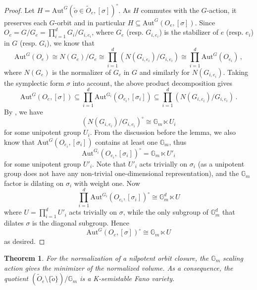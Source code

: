 \documentclass[12pt]{amsart}
\newtheorem{thm}[prop]{Theorem}
\theoremstyle{definition}
\newcommand{\bT}{\mathbb{T}}
\newcommand{\bG}{\mathbb{G}}
\newcommand{\Aut}{\mathrm{Aut}}
\numberwithin{equation}{section}
\begin{document}
\begin{proof}
Let $H=\Aut^G(\tilde{o} \in \widetilde{O}_e,[\sigma])^\circ$. As $H$ commutes with the $G$-action, it preserves each $G$-orbit and in particular $H\subseteq  \Aut^G(O_e,[\sigma])$.
Since $O_e=G/G_e = \prod_{i=1}^d G_i/G_{i,e_i}$, where $G_e$ (resp. $G_{i,e_i}$) is the stabilizer of $e$ (resp. $e_i$) in $G$ (resp. $G_i$), we know that
\[
\Aut^G(O_e) \cong N(G_e)/G_e \cong \prod_{i=1}^d \left(N(G_{i,e_i})/G_{i,e_i}\right)\cong \prod_{i=1}^d \Aut^G(O_{e_i})\,,
\]
where $N(G_e)$ is the normalizer of $G_e$ in $G$ and similarly for $N(G_{i,e_i})$. Taking the symplectic form $\sigma$ into account, the above product decomposition gives
\[
\Aut^G(O_e,[\sigma]) \subseteq \prod_{i=1}^d \Aut^{G_i}(O_{e_i},[\sigma_i]) \subseteq \prod_{i=1}^d \left(N(G_{i,e_i})/G_{i,e_i}\right)\,. 
\]
By \cite[Theorem 7.1]{BK-nilpotent}, we have 
\[
\left(N(G_{i,e_i})/G_{i,e_i}\right)^\circ \cong \bG_m \ltimes U_i
\]
for some unipotent group $U_i$. From the discussion before the lemma, we also know that $\Aut^G(O_{e_i},[\sigma_i])$ contains at least one $\bG_m$, thus 
\[
\Aut^{G_i}(O_{e_i},[\sigma_i])^\circ = \bG_m \ltimes U'_i
\]
for some unipotent group $U'_i$. Note that $U'_i$ acts trivially on $\sigma_i$ (as a unipotent group does not have any non-trivial one-dimensional representation), and the $\bG_m$ factor is dilating on $\sigma_i$ with weight one. Now 
\[
\prod_{i=1}^d \Aut^{G_i}(O_{e_i},[\sigma_i])^\circ \cong \bG_m^d \ltimes U
\]
where $U=\prod_{i=1}^d U'_i$ acts trivially on $\sigma$, while the only subgroup of $\bG_m^d$ that dilates $\sigma$ is the diagonal subgroup. Hence 
\[
\Aut^G(O_e,[\sigma])^\circ \cong \bG_m\ltimes U
\]
as desired.
\end{proof}

\begin{thm}\label{t-nilpotent}
For the normalization of a nilpotent orbit closure, the $\bG_m$ scaling action gives the minimizer of the normalized volume. As a consequence, the quotient $\left(\widetilde{O}_e \setminus \{\tilde{o}\}\right)/\bG_m$ is a K-semistable Fano variety.
\end{thm}
\end{document}
